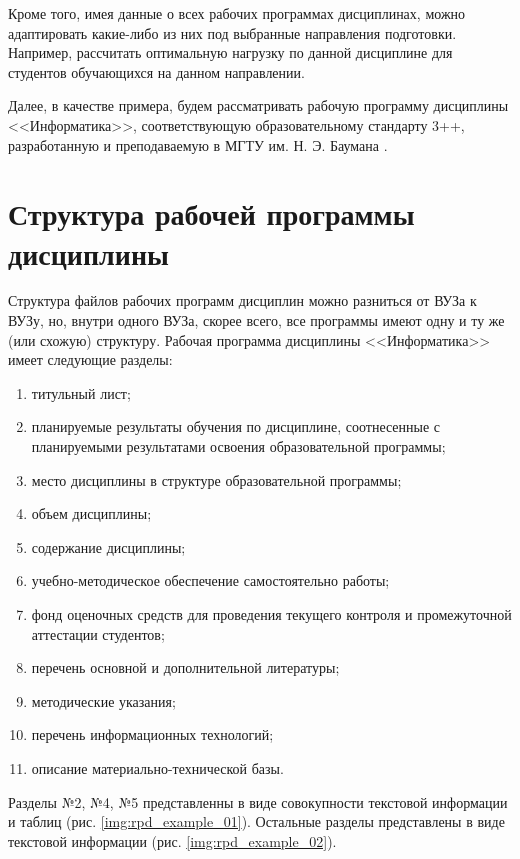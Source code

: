 Кроме того, имея данные о всех рабочих программах дисциплинах, можно адаптировать какие-либо из них под выбранные направления подготовки. Например, рассчитать оптимальную нагрузку по данной дисциплине для студентов обучающихся на данном направлении.

Далее, в качестве примера, будем рассматривать рабочую программу дисциплины <<Информатика>>, соответствующую образовательному стандарту 3++, разработанную и преподаваемую в МГТУ им. Н. Э. Баумана \cite{bmstu}.

\section{Структура рабочей программы дисциплины} \label{sec:rpd-structure}

Структура файлов рабочих программ дисциплин можно разниться от ВУЗа к ВУЗу, но, внутри одного ВУЗа, скорее всего, все программы имеют одну и ту же (или схожую) структуру. Рабочая программа дисциплины <<Информатика>> имеет следующие разделы:

\begin{enumerate}
	\item титульный лист;
	\item планируемые результаты обучения по дисциплине, соотнесенные с планируемыми результатами освоения образовательной программы;
	\item место дисциплины в структуре образовательной программы;
	\item объем дисциплины;
	\item содержание дисциплины;
	\item учебно-методическое обеспечение самостоятельно работы;
	\item фонд оценочных средств для проведения текущего контроля и промежуточной аттестации студентов;
	\item перечень основной и дополнительной литературы;
	\item методические указания;
	\item перечень информационных технологий;
	\item описание материально-технической базы.
\end{enumerate}

Разделы №2, №4, №5 представленны в виде совокупности текстовой информации и таблиц (рис. \ref{img:rpd_example_01}). Остальные разделы представлены в виде текстовой информации (рис. \ref{img:rpd_example_02}).

